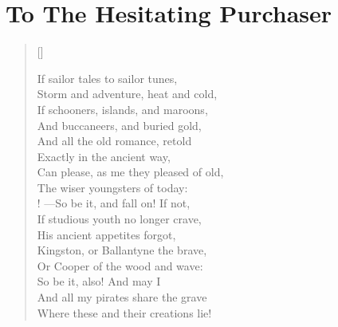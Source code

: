 \documentclass[
paper=5.5in:8.5in,
]{scrbook} %
\begin{document}
\chapter*{To The Hesitating Purchaser}
\vfill
\settowidth{\versewidth}{Can please, as me they pleased of old,}
\begin{verse}[\versewidth]
\begin{altverse}
If sailor tales to sailor tunes,\\
Storm and adventure, heat and cold,\\
If schooners, islands, and maroons,\\
And buccaneers, and buried gold,\\
And all the old romance, retold\\
Exactly in the ancient way,\\
Can please, as me they pleased of old,\\
The wiser youngsters of today:\\!
---So be it, and fall on! If not,\\
If studious youth no longer crave,\\
His ancient appetites forgot,\\
Kingston, or Ballantyne the brave,\\
Or Cooper of the wood and wave:\\
So be it, also! And may I\\
And all my pirates share the grave\\
Where these and their creations lie!\\
\end{altverse}
\end{verse}
\vfill
\thispagestyle{empty}
\clearpage






















\end{document}
